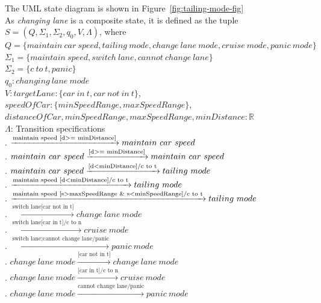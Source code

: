 \documentclass[12pt]{article}
\begin{document}
\begin{spacing}{1.5}
\noindent The UML state diagram is shown in Figure~\ref{fig:tailing-mode-fig}\\


\noindent As \textit{changing lane} is a composite state, it is defined as the tuple $S = (Q, \Sigma_1, \Sigma_2, q_0, V, \Lambda)$, where\\

\noindent $Q = \{maintain~car~speed, tailing~mode, change~lane~mode, cruise~mode, panic~mode\}$\\
\noindent $\Sigma_1 = \{maintain~speed, switch~lane, cannot~change~lane\}$\\
\noindent $\Sigma_2 = \{c~to~t, panic\}$\\
\noindent $q_0: changing~lane~mode$\\
\noindent $V: targetLane: \{car~in~t, car~not~in~t\}$,\\
\indent $speedOfCar: \{minSpeedRange, maxSpeedRange\},$\\
\indent $distanceOfCar, minSpeedRange, maxSpeedRange, minDistance: \mathbb{R} $\\
\noindent $\Lambda$: Transition specifications\\
. $\xrightarrow {\text{maintain speed [d\textgreater = minDistance]}} maintain~car~speed$\\
. $maintain~car~speed\xrightarrow {\text{[d\textgreater = minDistance]}} maintain~car~speed$\\
. $maintain~car~speed\xrightarrow {\text{[d\textless minDistance]/c to t}} tailing~mode$\\
. $\xrightarrow {\text{maintain speed [d\textless minDistance]/c to t}} tailing~mode$\\
. $\xrightarrow {\text{maintain speed [s\textgreater maxSpeedRange \& s\textless minSpeedRange]/c to t}} tailing~mode$\\
. $\xrightarrow {\text{switch lane[car not in t]}} change~lane~mode$\\
. $\xrightarrow {\text{switch lane[car in t]/c to n}} cruise~mode$\\
. $\xrightarrow {\text{switch lane;cannot change lane/panic}} panic~mode$\\
. $change~lane~mode\xrightarrow {\text{[car not in t]}} change~lane~mode$\\
. $change~lane~mode\xrightarrow {\text{[car in t]/c to n}} cruise~mode$\\
. $change~lane~mode\xrightarrow {\text{cannot change lane/panic}} panic~mode$\\


\end{spacing}
\end{document}
